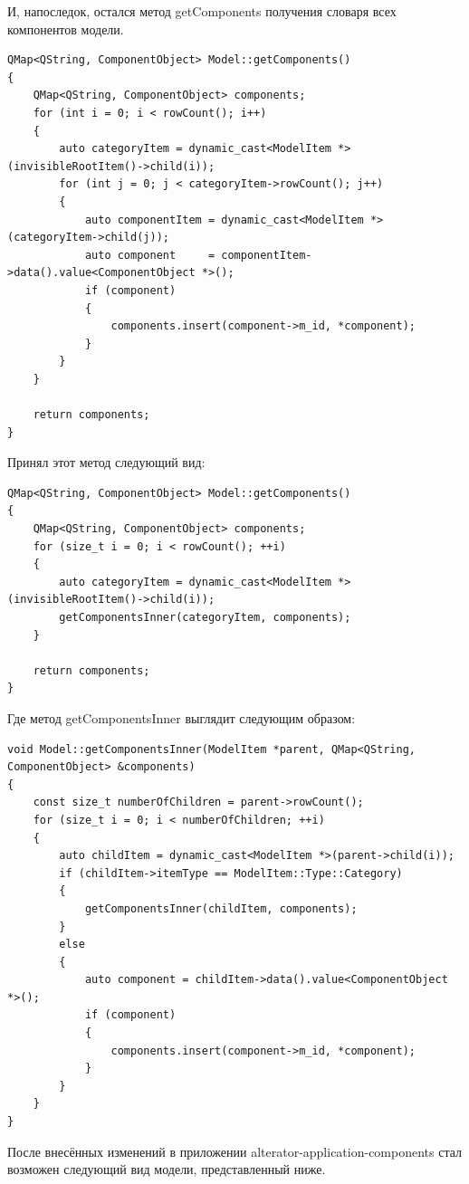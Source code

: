 \documentclass[bachelor, och, pract]{SCWorks}
\begin{document}
И, напоследок, остался метод getComponents получения словаря всех компонентов модели.

\begin{verbatim}
QMap<QString, ComponentObject> Model::getComponents()
{
    QMap<QString, ComponentObject> components;
    for (int i = 0; i < rowCount(); i++)
    {
        auto categoryItem = dynamic_cast<ModelItem *>(invisibleRootItem()->child(i));
        for (int j = 0; j < categoryItem->rowCount(); j++)
        {
            auto componentItem = dynamic_cast<ModelItem *>(categoryItem->child(j));
            auto component     = componentItem->data().value<ComponentObject *>();
            if (component)
            {
                components.insert(component->m_id, *component);
            }
        }
    }

    return components;
}
\end{verbatim}

Принял этот метод следующий вид:

\begin{verbatim}
QMap<QString, ComponentObject> Model::getComponents()
{
    QMap<QString, ComponentObject> components;
    for (size_t i = 0; i < rowCount(); ++i)
    {
        auto categoryItem = dynamic_cast<ModelItem *>(invisibleRootItem()->child(i));
        getComponentsInner(categoryItem, components);
    }

    return components;
}
\end{verbatim}

Где метод getComponentsInner выглядит следующим образом:

\begin{verbatim}
void Model::getComponentsInner(ModelItem *parent, QMap<QString, ComponentObject> &components)
{
    const size_t numberOfChildren = parent->rowCount();
    for (size_t i = 0; i < numberOfChildren; ++i)
    {
        auto childItem = dynamic_cast<ModelItem *>(parent->child(i));
        if (childItem->itemType == ModelItem::Type::Category)
        {
            getComponentsInner(childItem, components);
        }
        else
        {
            auto component = childItem->data().value<ComponentObject *>();
            if (component)
            {
                components.insert(component->m_id, *component);
            }
        }
    }
}
\end{verbatim}

После внесённых изменений в приложении alterator-application-components стал возможен следующий вид модели, представленный ниже.
\end{document}
